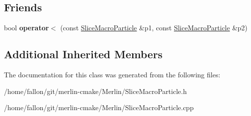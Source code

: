 \subsection*{Friends}
\begin{DoxyCompactItemize}
\item 
\mbox{\label{classSMPTracking_1_1SliceMacroParticle_a8b486ad5e113b7c950f1abd3123a414a}} 
bool {\bfseries operator$<$} (const \hyperlink{classSMPTracking_1_1SliceMacroParticle}{Slice\+Macro\+Particle} \&p1, const \hyperlink{classSMPTracking_1_1SliceMacroParticle}{Slice\+Macro\+Particle} \&p2)
\end{DoxyCompactItemize}
\subsection*{Additional Inherited Members}


The documentation for this class was generated from the following files\+:\begin{DoxyCompactItemize}
\item 
/home/fallon/git/merlin-\/cmake/\+Merlin/Slice\+Macro\+Particle.\+h\item 
/home/fallon/git/merlin-\/cmake/\+Merlin/Slice\+Macro\+Particle.\+cpp\end{DoxyCompactItemize}
